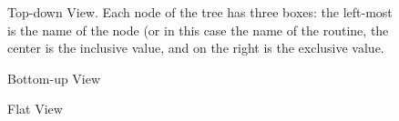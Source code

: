 \begin{figure}[t]
\caption{Top-down View. Each node of the tree has three boxes: the left-most is the name of the node (or in this case the name of the routine, the center is the inclusive value, and on the right is the exclusive value.}
\label{fig:cct}
\end{figure}

\begin{figure}
\caption{Bottom-up View}
\label{fig:metrics-callers}
\end{figure}

\begin{figure}
\caption{Flat View}
\label{fig:metrics-flat}
\end{figure}


